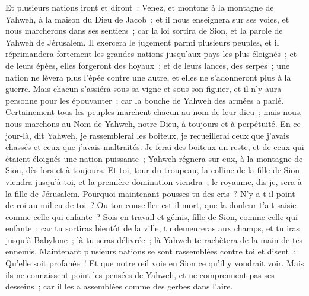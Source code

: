 \begin{multicols}{2}
Et plusieurs nations iront et diront~: Venez, et montons à la montagne de Yahweh, à la maison du Dieu de Jacob~; et il nous enseignera sur ses voies, et nous marcherons dans ses sentiers~; car la loi sortira de Sion, et la parole de Yahweh de Jérusalem.
Il exercera le jugement parmi plusieurs peuples, et il réprimandera fortement les grandes nations jusqu'aux pays les plus éloignés~; et de leurs épées, elles forgeront des hoyaux~; et de leurs lances, des serpes~; une nation ne lèvera plus l'épée contre une autre, et elles ne s'adonneront plus à la guerre.
Mais chacun s'assiéra sous sa vigne et sous son figuier, et il n'y aura personne pour les épouvanter~; car la bouche de Yahweh des armées a parlé.
Certainement tous les peuples marchent chacun au nom de leur dieu~; mais nous, nous marchons au Nom de Yahweh, notre Dieu, à toujours et à perpétuité.
En ce jour-là, dit Yahweh, je rassemblerai les boiteux, je recueillerai ceux que j'avais chassés et ceux que j'avais maltraités.
Je ferai des boiteux un reste, et de ceux qui étaient éloignés une nation puissante~; Yahweh régnera sur eux, à la montagne de Sion, dès lors et à toujours.
Et toi, tour du troupeau, la colline de la fille de Sion viendra jusqu'à toi, et la première domination viendra~; le royaume, dis-je, sera à la fille de Jérusalem.
Pourquoi maintenant pousses-tu des cris~? N'y a-t-il point de roi au milieu de toi~? Ou ton conseiller est-il mort, que la douleur t'ait saisie comme celle qui enfante~?
Sois en travail et gémis, fille de Sion, comme celle qui enfante~; car tu sortiras bientôt de la ville, tu demeureras aux champs, et tu iras jusqu'à Babylone~; là tu seras délivrée~; là Yahweh te rachètera de la main de tes ennemis.
Maintenant plusieurs nations se sont rassemblées contre toi et disent~: Qu'elle soit profanée~! Et que notre œil voie en Sion ce qu'il y voudrait voir.
Mais ils ne connaissent point les pensées de Yahweh, et ne comprennent pas ses desseins~; car il les a assemblées comme des gerbes dans l'aire.

\end{multicols}
